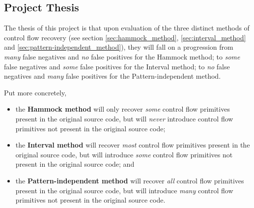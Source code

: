 
\subsection{Project Thesis}


The thesis of this project is that upon evaluation of the three distinct methods of control flow recovery (see section \ref{sec:hammock_method}, \ref{sec:interval_method} and \ref{sec:pattern-independent_method}), they will fall on a progression from \textit{many} false negatives and \textit{no} false positives for the Hammock method; to \textit{some} false negatives and \textit{some} false positives for the Interval method; to \textit{no} false negatives and \textit{many} false positives for the Pattern-independent method.

Put more concretely,
\begin{itemize}
	\item the \textbf{Hammock method} will only recover \textit{some} control flow primitives present in the original source code, but will \textit{never} introduce control flow primitives not present in the original source code;
	\item the \textbf{Interval method} will recover \textit{most} control flow primitives present in the original source code, but will introduce \textit{some} control flow primitives not present in the original source code; and
	\item the \textbf{Pattern-independent method} will recover \textit{all} control flow primitives present in the original source code, but will introduce \textit{many} control flow primitives not present in the original source code.
\end{itemize}
